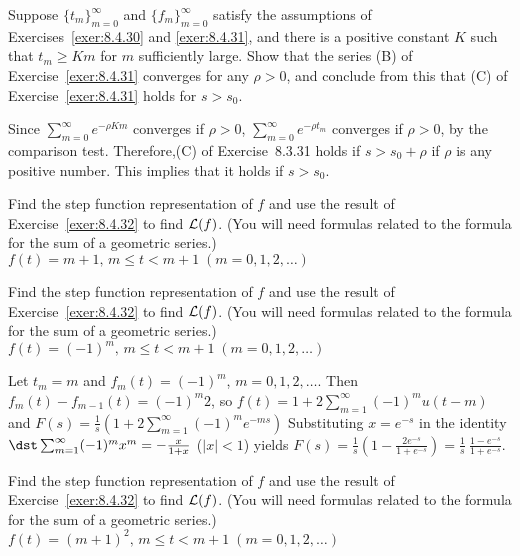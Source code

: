 \documentclass{ximera}
\begin{document}
\begin{problem}\label{exer:8.4.32} Suppose $\{t_m\}_{m=0}^\infty$ and
$\{f_m\}_{m=0}^\infty$ satisfy the assumptions of
Exercises~\ref{exer:8.4.30} and \ref{exer:8.4.31}, and
there is a positive constant $K$ such that $t_m\ge Km$ for $m$
sufficiently large. Show that the series (B) of
Exercise~\ref{exer:8.4.31} converges for any $\rho>0$, and conclude from
this that (C) of Exercise~\ref{exer:8.4.31} holds for $s>s_0$.

\begin{solution}
Since $\sum_{m=0}^\infty e^{-\rho Km}$
converges if $\rho>0$, $\sum_{m=0}^\infty e^{-\rho t_m}$ converges
if $\rho>0$, by the comparison test. Therefore,(C) of
Exercise~8.3.31 holds if $s>s_0+\rho$ if $\rho$ is any positive
number. This implies that it holds if $s>s_0$.
\end{solution}
\end{problem}



\begin{problem}\label{exer:8.4.33}
 Find the step
function representation of $f$ and use the result of
Exercise~\ref{exer:8.4.32} to find ${\cal L}(f)$. (You will need
formulas related to the formula for the sum of a geometric series.)
$f(t)=m+1,\,m\le t<m+1\; (m=0,1,2,\dots)$
\end{problem}

\begin{problem}\label{exer:8.4.34}
 Find the step
function representation of $f$ and use the result of
Exercise~\ref{exer:8.4.32} to find ${\cal L}(f)$. (You will need
formulas related to the formula for the sum of a geometric series.)
$f(t)=(-1)^m,\,m\le t<m+1\; (m=0,1,2,\dots)$

\begin{solution}
Let $t_m=m$ and $f_m(t)=(-1)^m$, $m=0,1,2,\dots$.
Then $f_m(t)-f_{m-1}(t)=(-1)^m2$, so
$f(t)=1+2\sum_{m=1}^\infty (-1)^mu(t-m)$ and
$F(s)=\frac{1}{s}\left(1+2\sum_{m=1}^\infty(-1)^me^{-ms}
\right)$
Substituting $x=e^{-s}$ in the identity $\dst\sum_{m=1}^\infty
(-1)^mx^m=-\frac{x}{1+x}$ ($|x|<1$) yields
$F(s)=\frac{1}{s}\left(1-\frac{2e^{-s}}{1+e^{-s}}\right)=
\frac{1}{s}\ \frac{1-e^{-s}}{1+e^{-s}}$.
\end{solution}
\end{problem}

\begin{problem}\label{exer:8.4.35}
Find the step function representation of $f$ and use the result of Exercise~\ref{exer:8.4.32} to find ${\cal L}(f)$. (You will need
formulas related to the formula for the sum of a geometric series.)
$f(t)=(m+1)^2,\,m\le t<m+1\; (m=0,1,2,\dots)$
\end{problem}
\end{document}
